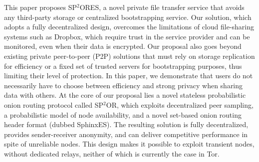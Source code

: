 %
This paper proposes SP$^2$ORES, a novel private file transfer service that avoids any third-party storage or centralized bootstrapping service.
Our solution, which adopts a fully decentralized design, overcomes the limitations of cloud file-sharing systems such as Dropbox, which require trust in the service provider and can be monitored, even when their data is encrypted. Our proposal also goes beyond existing private peer-to-peer (P2P) solutions that must rely on storage replication for efficiency or a fixed set of trusted servers for bootstrapping purposes, thus limiting their level of protection. %
In this paper, we demonstrate that users do not necessarily have to choose between efficiency and strong privacy when sharing data with others. %
 At the core of our proposal lies a novel stateless probabilistic onion routing protocol called SP$^2$OR, which exploits decentralized peer sampling, a probabilistic model of node availability, and a novel set-based onion routing header format (dubbed SphinxES). 
The resulting solution is fully decentralized, provides sender-receiver anonymity, and can deliver competitive performance in spite of unreliable nodes. %
This design makes it possible to exploit transient nodes, without dedicated relays, %
neither of which is currently the case in Tor.
 

